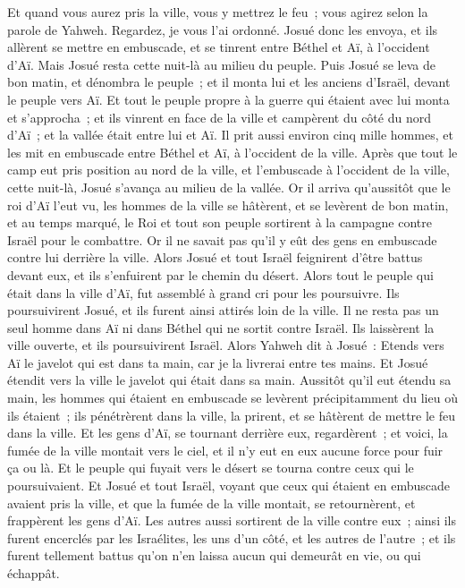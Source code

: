 \begin{multicols}{2}
Et quand vous aurez pris la ville, vous y mettrez le feu~; vous agirez selon la parole de Yahweh. Regardez, je vous l'ai ordonné.
Josué donc les envoya, et ils allèrent se mettre en embuscade, et se tinrent entre Béthel et Aï, à l'occident d'Aï. Mais Josué resta cette nuit-là au milieu du peuple.
Puis Josué se leva de bon matin, et dénombra le peuple~; et il monta lui et les anciens d'Israël, devant le peuple vers Aï.
Et tout le peuple propre à la guerre qui étaient avec lui monta et s'approcha~; et ils vinrent en face de la ville et campèrent du côté du nord d'Aï~; et la vallée était entre lui et Aï.
Il prit aussi environ cinq mille hommes, et les mit en embuscade entre Béthel et Aï, à l'occident de la ville.
Après que tout le camp eut pris position au nord de la ville, et l'embuscade à l'occident de la ville, cette nuit-là, Josué s'avança au milieu de la vallée.
Or il arriva qu'aussitôt que le roi d'Aï l'eut vu, les hommes de la ville se hâtèrent, et se levèrent de bon matin, et au temps marqué, le Roi et tout son peuple sortirent à la campagne contre Israël pour le combattre. Or il ne savait pas qu'il y eût des gens en embuscade contre lui derrière la ville.
Alors Josué et tout Israël feignirent d'être battus devant eux, et ils s'enfuirent par le chemin du désert.
Alors tout le peuple qui était dans la ville d'Aï, fut assemblé à grand cri pour les poursuivre. Ils poursuivirent Josué, et ils furent ainsi attirés loin de la ville.
Il ne resta pas un seul homme dans Aï ni dans Béthel qui ne sortit contre Israël. Ils laissèrent la ville ouverte, et ils poursuivirent Israël.
Alors Yahweh dit à Josué~: Etends vers Aï le javelot qui est dans ta main, car je la livrerai entre tes mains. Et Josué étendit vers la ville le javelot qui était dans sa main.
Aussitôt qu'il eut étendu sa main, les hommes qui étaient en embuscade se levèrent précipitamment du lieu où ils étaient~; ils pénétrèrent dans la ville, la prirent, et se hâtèrent de mettre le feu dans la ville.
Et les gens d'Aï, se tournant derrière eux, regardèrent~; et voici, la fumée de la ville montait vers le ciel, et il n'y eut en eux aucune force pour fuir ça ou là. Et le peuple qui fuyait vers le désert se tourna contre ceux qui le poursuivaient.
Et Josué et tout Israël, voyant que ceux qui étaient en embuscade avaient pris la ville, et que la fumée de la ville montait, se retournèrent, et frappèrent les gens d'Aï.
Les autres aussi sortirent de la ville contre eux~; ainsi ils furent encerclés par les Israélites, les uns d'un côté, et les autres de l'autre~; et ils furent tellement battus qu'on n'en laissa aucun qui demeurât en vie, ou qui échappât.

\end{multicols}
